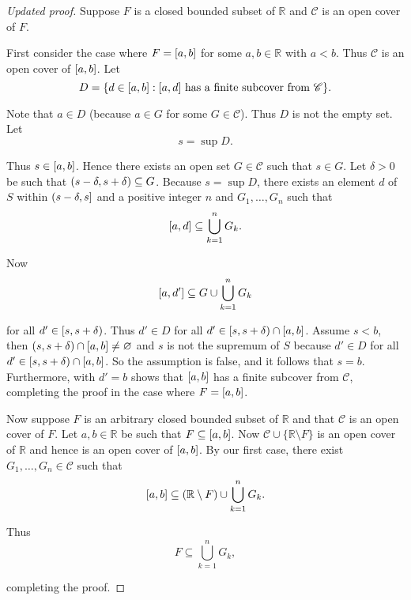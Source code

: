 \begin{proof}[Updated proof]
    Suppose $F$ is a closed bounded subset of $\mathbb{R}$ and $\mathscr{C}$ is an open cover of $F$.

    First consider the case where $F = \left[{a, b}\right]$ for some $a, b\in \mathbb{R}$ with $a < b$. Thus $\mathscr{C}$ is an open cover of $\left[{a, b}\right]$. Let
    \[
        D = \{ d \in \left[{a, b}\right]: \text{$\left[{a, d}\right]$ has a finite subcover from $\mathscr{C}$} \}.
    \]

    Note that $a\in D$ (because $a\in G$ for some $G\in\mathscr{C}$). Thus $D$ is not the empty set. Let
    \[
        s = \sup D.
    \]

    Thus $s\in\left[{a, b}\right]$. Hence there exists an open set $G\in\mathscr{C}$ such that $s\in G$. Let $\delta > 0$ be such that $\left({s - \delta, s + \delta}\right) \subseteq G$. Because $s = \sup D$, there exists an element $d$ of $S$ within $\left({s - \delta, s}\right]$ and a positive integer $n$ and $G_{1}, \ldots, G_{n}$ such that
    \[
        \left[{a, d}\right] \subseteq \bigcup^{n}_{k=1}G_{k}.
    \]

    Now
    \[
        \left[{a, d'}\right] \subseteq G\cup \bigcup^{n}_{k=1}G_{k}
    \]

    for all $d'\in \left[{s, s+\delta}\right)$. Thus $d'\in D$ for all $d'\in\left[{s, s+\delta}\right)\cap\left[{a, b}\right]$. Assume $s < b$, then $\left({s, s+\delta}\right)\cap\left[{a, b}\right]\ne\varnothing$ and $s$ is not the supremum of $S$ because $d'\in D$ for all $d'\in\left[{s, s+\delta}\right)\cap\left[{a, b}\right]$. So the assumption is false, and it follows that $s = b$. Furthermore, with $d' = b$ shows that $\left[{a, b}\right]$ has a finite subcover from $\mathscr{C}$, completing the proof in the case where $F = \left[{a, b}\right]$.

    Now suppose $F$ is an arbitrary closed bounded subset of $\mathbb{R}$ and that $\mathscr{C}$ is an open cover of $F$. Let $a, b\in\mathbb{R}$ be such that $F\subseteq \left[{a, b}\right]$. Now $\mathscr{C}\cup \{\mathbb{R}\setminus F\}$ is an open cover of $\mathbb{R}$ and hence is an open cover of $\left[{a, b}\right]$. By our first case, there exist $G_{1}, \ldots, G_{n}\in\mathscr{C}$ such that
    \[
        \left[{a, b}\right] \subseteq (\mathbb{R}\setminus F)\cup \bigcup^{n}_{k=1}G_{k}.
    \]

    Thus
    \[
        F\subseteq \bigcup^{n}_{k=1}G_{k},
    \]

    completing the proof.
\end{proof}
\newpage

